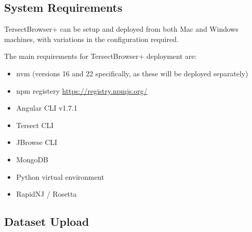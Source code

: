 \documentclass[12pt]{article}
\begin{document}
\subsection{System Requirements}
TersectBrowser+ can be setup and deployed from both Mac and Windows machines, with variations in the configuration required. 

The main requirements for TersectBrowser+ deployment are:
\begin{itemize}
    \item nvm (versions 16 and 22 specifically, as these will be deployed separately)
    \item npm registery \url{https://registry.npmjs.org/}
    \item Angular CLI v1.7.1
    \item Tersect CLI
    \item JBrowse CLI
    \item MongoDB
    \item Python virtual environment
    \item RapidNJ / Rosetta
\end{itemize}

\subsection{Dataset Upload}
\end{document}
